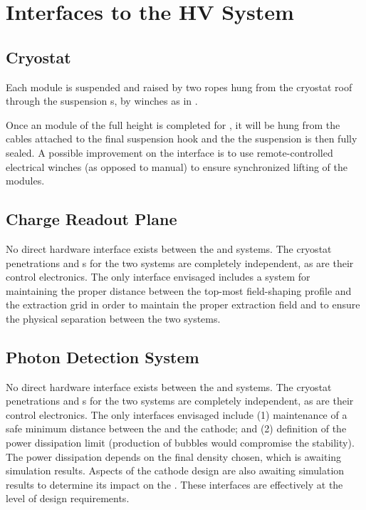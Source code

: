 \section{Interfaces to the HV System}
\label{sec:fddp-hv-intfc}

\subsection{Cryostat}
\label{sec:fddp-hv-intfc-to-cryostat}

Each  module is suspended and raised by two ropes hung from the cryostat roof through the  suspension \fdth{}s, by winches as in .  

Once an  module of the full height is completed for , it will be hung 
from the cables attached to the final suspension hook and the  
 the suspension \fdth is then fully sealed. 
A possible improvement on the  interface is to use remote-controlled electrical winches (as opposed to manual) to ensure synchronized lifting of the modules.

\subsection{Charge Readout Plane}
\label{sec:fddp-hv-intfc-to-crp}

No direct hardware interface exists between the  and  systems. The cryostat penetrations and \fdth{}s for the two systems are completely independent, as are their control electronics. The only interface envisaged includes a system for maintaining the proper distance between the top-most field-shaping profile and the extraction grid in order to maintain the proper extraction field and to ensure the physical separation between the two systems. 

\subsection{Photon Detection System}
\label{sec:fddp-hv-intfc-to-pds}


No direct hardware interface exists between the  and  systems. The cryostat penetrations and \fdth{}s for the two systems are completely independent, as are their control electronics. The only interfaces envisaged include (1) maintenance of a safe minimum distance between the  and the \dptargetdriftvoltneg cathode; and (2)
 definition of the  power dissipation limit (production of bubbles would compromise the  stability). The power dissipation depends on the final  density chosen, which is awaiting simulation results. Aspects of the cathode design are also awaiting simulation results to determine its impact on the . 
These interfaces are effectively at the level of design requirements. 


